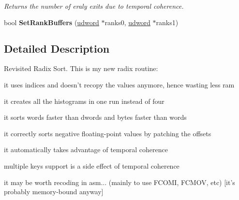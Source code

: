 \begin{DoxyCompactItemize}
\begin{DoxyCompactList}\small\item\em Returns the number of eraly exits due to temporal coherence. \end{DoxyCompactList}\item 
\hypertarget{class_radix_sort_a3441ac4970b0d99a3a68769b4bc3775f}{bool {\bfseries Set\+Rank\+Buffers} (\hyperlink{_ice_types_8h_a44c6f1920ba5551225fb534f9d1a1733}{udword} $\ast$ranks0, \hyperlink{_ice_types_8h_a44c6f1920ba5551225fb534f9d1a1733}{udword} $\ast$ranks1)}\label{class_radix_sort_a3441ac4970b0d99a3a68769b4bc3775f}

\end{DoxyCompactItemize}


\subsection{Detailed Description}
Revisited Radix Sort. This is my new radix routine\+:
\begin{DoxyItemize}
\item it uses indices and doesn't recopy the values anymore, hence wasting less ram
\item it creates all the histograms in one run instead of four
\item it sorts words faster than dwords and bytes faster than words
\item it correctly sorts negative floating-\/point values by patching the offsets
\item it automatically takes advantage of temporal coherence
\item multiple keys support is a side effect of temporal coherence
\item it may be worth recoding in asm... (mainly to use F\+C\+O\+M\+I, F\+C\+M\+O\+V, etc) \mbox{[}it's probably memory-\/bound anyway\mbox{]}
\end{DoxyItemize}

